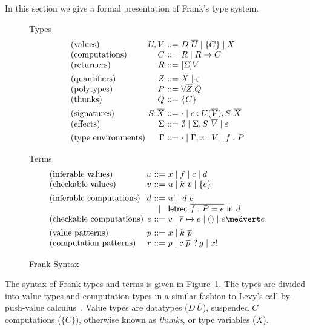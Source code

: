 \documentclass[preprint]{sigplanconf}
\makeatletter
\newcommand{\many}{\overline}
\newcommand\ba{\begin{array}}
\newcommand\ea{\end{array}}
\newenvironment{syntax}{\[\ba{@{}l@{~}r@{~}c@{~}l@{}}}{\ea\]}
\newcommand{\sig}{S}
\newcommand{\sigs}{\Sigma}
\newcommand{\effbox}[1]{[#1]}
\newcommand{\key}[1]{\mathsf{#1}}
\newcommand{\handleSymbol}{\mathbin{?}}
\newcommand{\handle}[2]{{#1} \handleSymbol {#2}}
\newcommand{\thunk}[1]{\{{#1}\}}
\newcommand{\force}[1]{{#1}!}
\newcommand\slab[1]{(\textrm{#1})}
\makeatother
\begin{document}
In this section we give a formal presentation of Frank's type system.
%
\begin{figure}
Types
\begin{syntax}
\slab{values}       &U, V          &::=& D~\many{U} \mid \thunk{C} \mid X \\
\slab{computations} &C             &::=& R \mid R \to C \\
\slab{returners}    &R             &::=& \effbox{\sigs}V
\\[1ex]
\slab{quantifiers}  &Z             &::=& X \mid \varepsilon \\
\slab{polytypes}    &P             &::=& \forall \many{Z}.Q \\
\slab{thunks}       &Q             &::=& \thunk{C}
\\[1ex]
\slab{signatures}   &\sig~\many{X} &::=& \cdot \mid c : U(\many{V}), \sig~\many{X} \\
\slab{effects}      &\sigs  &::=&
  \emptyset \mid \sigs, \sig~\many{V} \mid \varepsilon
\\[1ex]
\slab{type environments}     &\Gamma        &::=& \cdot \mid \Gamma, x:V \mid f:P \\
\end{syntax}

Terms
\begin{syntax}
\slab{inferable values}&u       &::=& x \mid f \mid c \mid d \\
\slab{checkable values}&v       &::=& u \mid k~\many{v} \mid \thunk{e}
\\[1ex]
\slab{inferable computations}&d &::=& \force{u} \mid d~e \\
                             &&\mid& \key{letrec}~\many{f : P = e}~\key{in}~d \\
\slab{checkable computations} &e &::=& v \mid \many{r} \mapsto e \mid () \mid e \medvert e
\\[1ex]
\slab{value patterns}&p       &::=& x \mid k~\many{p}                              \\
\slab{computation patterns}&r &::=& p \mid \handle{c~\many{p}\,}{g} \mid \force{x} \\
\end{syntax}

\caption{Frank Syntax}
\label{fig:frank-syntax}
\end{figure}
%
The syntax of Frank types and terms is given in
Figure~\ref{fig:frank-syntax}. The types are divided into value types
and computation types in a similar fashion to Levy's
call-by-push-value calculus~\cite{Levy2004}.
%
Value types are datatypes ($D~\many{U}$), suspended $C$ computations
($\thunk{C}$), otherwise known as \emph{thunks}, or type variables
($X$).
\end{document}
